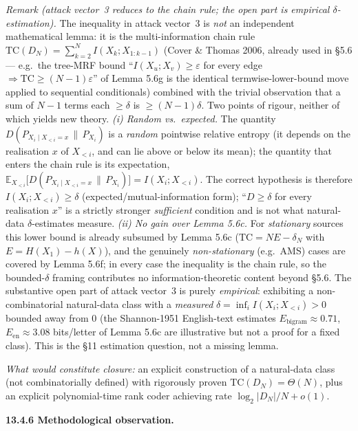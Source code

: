 \documentclass[
]{article}
\begin{document}
\emph{Remark (attack vector~3 reduces to the chain rule; the open
part is empirical $\delta$-estimation).} The inequality in
attack vector~3 is \emph{not} an independent mathematical lemma: it
is the multi-information chain rule
$\mathrm{TC}(D_N) = \sum_{k=2}^{N} I(X_k; X_{1:k-1})$ (Cover \&
Thomas 2006, already used in \S5.6 --- e.g.\ the tree-MRF bound
``$I(X_u; X_v) \geq \varepsilon$ for every edge $\Rightarrow
\mathrm{TC} \geq (N-1)\varepsilon$'' of Lemma 5.6g is the identical
termwise-lower-bound move applied to sequential conditionals)
combined with the trivial observation that a sum of $N-1$ terms each
$\geq \delta$ is $\geq (N-1)\delta$. Two points of rigour, neither of
which yields new theory. \emph{(i) Random vs.\ expected.} The
quantity $D(P_{X_i \mid X_{<i}=x} \,\|\, P_{X_i})$ is a \emph{random}
pointwise relative entropy (it depends on the realisation $x$ of
$X_{<i}$, and can lie above or below its mean); the quantity that
enters the chain rule is its expectation,
$\mathbb{E}_{X_{<i}}\!\bigl[D(P_{X_i \mid X_{<i}=x} \,\|\, P_{X_i})\bigr]
= I(X_i; X_{<i})$. The correct hypothesis is therefore
$I(X_i; X_{<i}) \geq \delta$ (expected/mutual-information form);
``$D \geq \delta$ for every realisation $x$'' is a strictly stronger
\emph{sufficient} condition and is not what natural-data
$\delta$-estimates measure. \emph{(ii) No gain over Lemma 5.6c.} For
\emph{stationary} sources this lower bound is already subsumed by
Lemma 5.6c ($\mathrm{TC} = N E - \delta_N$ with $E = H(X_1) - h(X)$),
and the genuinely \emph{non-stationary} (e.g.\ AMS) cases are covered
by Lemma 5.6f; in every case the inequality is the chain rule, so the
bounded-$\delta$ framing contributes no information-theoretic content
beyond \S5.6. The substantive open part of attack vector~3 is purely
\emph{empirical}: exhibiting a non-combinatorial natural-data class
with a \emph{measured} $\delta = \inf_i I(X_i; X_{<i}) > 0$ bounded
away from $0$ (the Shannon-1951 English-text estimates
$E_{\mathrm{bigram}} \approx 0.71$, $E_{\mathrm{en}} \approx 3.08$
bits/letter of Lemma 5.6c are illustrative but not a proof for a
fixed class). This is the §11 estimation question, not a missing
lemma.

\emph{What would constitute closure:} an explicit construction of a
natural-data class (not combinatorially defined) with rigorously
proven $\mathrm{TC}(D_N) = \Theta(N)$, plus an explicit polynomial-time
rank coder achieving rate $\log_2 |D_N| / N + o(1)$.

\textbf{13.4.6 Methodological observation.}
\end{document}
